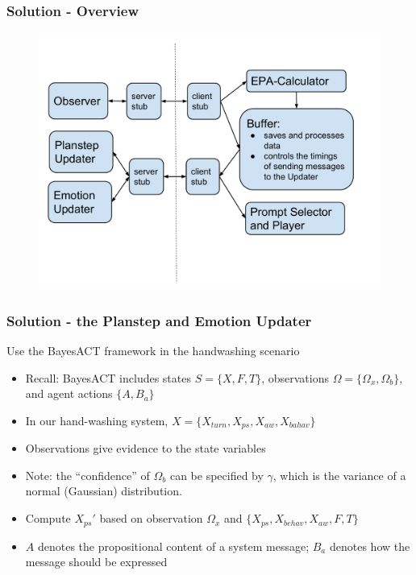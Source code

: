 \documentclass{beamer}
\begin{document}
\begin{frame}
\frametitle{Solution - Overview}
\begin{figure}
\centering
\includegraphics[trim = 5mm 15mm 5mm 20mm, clip, width=.8\linewidth]{fig/fig-system-overview.pdf}
\end{figure}
\end{frame}

\begin{frame}
\frametitle{Solution - the Planstep and Emotion Updater}
Use the BayesACT framework in the handwashing scenario
\begin{itemize}
\item Recall: BayesACT includes states $S = \{X, F, T\}$, observations $\Omega = \{\Omega_{x}, \Omega_{b}\}$, and agent actions $\{A, B_{a}\}$
\pause \item In our hand-washing system, $X = \{X_{turn}, X_{ps}, X_{aw}, X_{bahav}\}$
\pause \item Observations give evidence to the state variables
\item Note: the ``confidence'' of $\Omega_b$ can be specified by $\gamma$, which is the variance of a normal (Gaussian) distribution.
\pause \item Compute $X_{ps}'$ based on observation $\Omega_{x}$ and $\{X_{ps}, X_{behav}, X_{aw}, F, T\}$
\pause \item $A$ denotes the propositional content of a system message; $B_{a}$ denotes how the message should be expressed
\end{itemize}
\end{frame}
\end{document}
